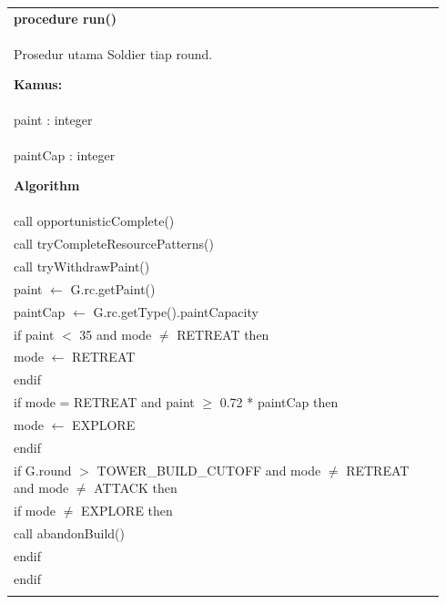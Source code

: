 \documentclass{article}
\newenvironment{pseudobox}
{
\centering
\begin{longtable}{|p{0.94\linewidth}|}
\hline
}
{
\\ \hline
\end{longtable}
\vspace{0.05cm}
}
\begin{document}
\begin{pseudobox}
\textbf{procedure run()} \\
{ Prosedur utama Soldier tiap round. }

\textbf{Kamus:} \\
\hspace*{1em} paint : integer \\
\hspace*{1em} paintCap : integer

\textbf{Algorithm} \\
\hspace*{1em} call opportunisticComplete() \\
\hspace*{1em} call tryCompleteResourcePatterns() \\
\hspace*{1em} call tryWithdrawPaint() \\

\hspace*{1em} paint $\leftarrow$ G.rc.getPaint() \\
\hspace*{1em} paintCap $\leftarrow$ G.rc.getType().paintCapacity \\

\hspace*{1em} if paint $<$ 35 and mode $\neq$ RETREAT then \\
\hspace*{2em} mode $\leftarrow$ RETREAT \\
\hspace*{1em} endif \\

\hspace*{1em} if mode = RETREAT and paint $\geq$ 0.72 * paintCap then \\
\hspace*{2em} mode $\leftarrow$ EXPLORE \\
\hspace*{1em} endif \\

\hspace*{1em} if G.round $>$ TOWER\_BUILD\_CUTOFF and mode $\neq$ RETREAT and mode $\neq$ ATTACK then \\
\hspace*{2em} if mode $\neq$ EXPLORE then \\
\hspace*{3em} call abandonBuild() \\
\hspace*{2em} endif \\
\hspace*{1em} endif \\


\end{pseudobox}
\end{document}
